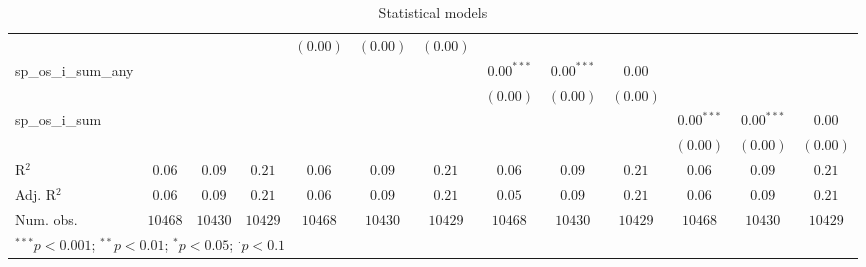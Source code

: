 \begin{sidewaystable}
\begin{center}
{\begin{tabular}{l c c c c c c c c c c c c}
                    &               &               &                 & $(0.00)$      & $(0.00)$        & $(0.00)$       &               &                 &                &               &                 &                \\
sp\_os\_i\_sum\_any &               &               &                 &               &                 &                & $0.00^{***}$  & $0.00^{***}$    & $0.00$         &               &                 &                \\
                    &               &               &                 &               &                 &                & $(0.00)$      & $(0.00)$        & $(0.00)$       &               &                 &                \\
sp\_os\_i\_sum      &               &               &                 &               &                 &                &               &                 &                & $0.00^{***}$  & $0.00^{***}$    & $0.00$         \\
                    &               &               &                 &               &                 &                &               &                 &                & $(0.00)$      & $(0.00)$        & $(0.00)$       \\
\hline
R$^2$               & $0.06$        & $0.09$        & $0.21$          & $0.06$        & $0.09$          & $0.21$         & $0.06$        & $0.09$          & $0.21$         & $0.06$        & $0.09$          & $0.21$         \\
Adj. R$^2$          & $0.06$        & $0.09$        & $0.21$          & $0.06$        & $0.09$          & $0.21$         & $0.05$        & $0.09$          & $0.21$         & $0.06$        & $0.09$          & $0.21$         \\
Num. obs.           & $10468$       & $10430$       & $10429$         & $10468$       & $10430$         & $10429$        & $10468$       & $10430$         & $10429$        & $10468$       & $10430$         & $10429$        \\
\hline
\multicolumn{13}{l}{\scriptsize{$^{***}p<0.001$; $^{**}p<0.01$; $^{*}p<0.05$; $^{\cdot}p<0.1$}}
\end{tabular}
}
\caption{Statistical models}
\label{table:coefficients}
\end{center}
\end{sidewaystable}
